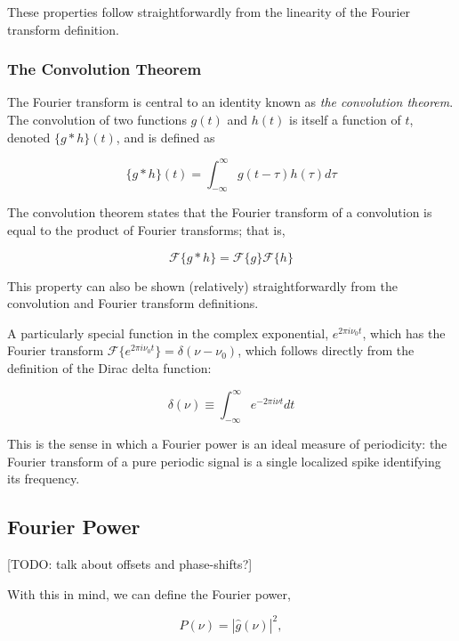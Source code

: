 \documentclass[preprint]{aastex}
\newcommand{\todo}[1]{{\color{red} [TODO: #1]}}
\begin{document}
These properties follow straightforwardly from the linearity of the Fourier transform definition.

\subsubsection{The Convolution Theorem}

The Fourier transform is central to an identity known as {\it the convolution theorem}.
The convolution of two functions $g(t)$ and $h(t)$ is itself a function of $t$, denoted $\{g \ast h\}(t)$, and is defined as

\begin{equation}
  \{g \ast h\}(t) = \int_{-\infty}^\infty g(t - \tau) h(\tau) d\tau
\end{equation}

The convolution theorem states that the Fourier transform of a convolution is equal to the product of Fourier transforms; that is,

\begin{equation}
  \mathcal{F}\{g \ast h\} = \mathcal{F}\{g\}\mathcal{F}\{h\}
\end{equation}

This property can also be shown (relatively) straightforwardly from the convolution and Fourier transform definitions.

A particularly special function in the complex exponential, $e^{2\pi i\nu_0 t}$, which has the Fourier transform $\mathcal{F}\{e^{2\pi i\nu_0 t}\} = \delta(\nu - \nu_0)$, which follows directly from the definition of the Dirac delta function:

\begin{equation}
  \delta(\nu) \equiv \int_{-\infty}^\infty e^{-2\pi i\nu t}dt
\end{equation}

This is the sense in which a Fourier power is an ideal measure of periodicity: the Fourier transform of a pure periodic signal is a single localized spike identifying its frequency.

\subsection{Fourier Power}

\todo{talk about offsets and phase-shifts?}

With this in mind, we can define the Fourier power,

\begin{equation}
  P(\nu) = \left|\hat{g}(\nu)\right|^2,
\end{equation}
\end{document}
